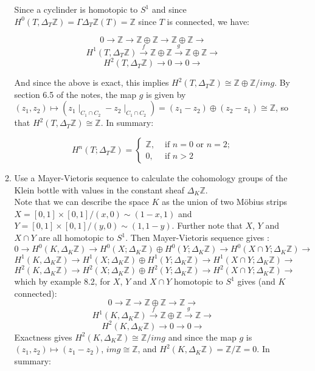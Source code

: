 \documentclass{article}
\newcommand{\zed}{\mathbb Z}
\begin{document}
\begin{enumerate}
\begin{enumerate}
Since a cyclinder is homotopic to $S^1$ and since $ H^0(T, \Delta_T\mathbb{Z}) = \Gamma \Delta_T\mathbb{Z} (T) = \mathbb{Z}$ since $T$ is connected, we have:

\[0 \rightarrow \mathbb{Z} \rightarrow \mathbb{Z} \oplus \mathbb{Z} \xrightarrow{}  \mathbb{Z} \oplus \mathbb{Z} \rightarrow\]
\[ H^1(T, \Delta_T\mathbb{Z}) \xrightarrow{f} \mathbb{Z} \oplus \mathbb{Z} \xrightarrow{g} \mathbb{Z} \oplus \mathbb{Z} \rightarrow\]
\[ H^2(T, \Delta_T\mathbb{Z}) \rightarrow 0 \rightarrow 0 \rightarrow\]
 
 And since the above is exact, this implies $H^2(T, \Delta_T\mathbb{Z})  \cong \mathbb{Z} \oplus \mathbb{Z} / im g$. By section 6.5 of the notes, the map $g$ is given by $(z_1,z_2) \mapsto (z_1\mid_{C_1 \cap C_2} - z_2\mid_{C_1 \cap C_2} ) = (z_1 - z_2) \oplus (z_2 - z_1) \cong \mathbb{Z} $, so that $H^2(T, \Delta_T\mathbb{Z}) \cong \mathbb{Z}$. In summary:
 
 \[H^n(T; \Delta_T\mathbb{Z}) = \begin{cases} 
 \mathbb{Z}, & \text{ if } n=0 \text{ or } n=2; \\
0, & \text{ if } n >2 
 \end{cases}
\]
\item Use a Mayer-Vietoris sequence to calculate the cohomology groups of the Klein bottle with values in the constant sheaf $\Delta_K\zed$. \\

Note that we can describe the space $K$ as the union of two M\"obius strips $X = [0,1]\times[0,1]/(x, 0) \sim (1 - x, 1)$ and $Y =  [0,1]\times[0,1]/(y, 0) \sim (1, 1-y)$. Further note that $X$, $Y$ and $X \cap Y$ are all homotopic to $S^1$. Then Mayer-Vietoris sequence gives :
\[0 \rightarrow H^0(K, \Delta_K\mathbb{Z}) \rightarrow H^0(X;\Delta_K\mathbb{Z}) \oplus H^0(Y;\Delta_K\mathbb{Z}) \rightarrow H^0(X \cap Y; \Delta_K\mathbb{Z}) \rightarrow\]
 \[H^1(K, \Delta_K\mathbb{Z}) \rightarrow H^1(X;\Delta_K\mathbb{Z}) \oplus H^1(Y;\Delta_K\mathbb{Z}) \rightarrow H^1(X \cap Y; \Delta_K\mathbb{Z}) \rightarrow  \]
\[H^2(K, \Delta_K\mathbb{Z}) \rightarrow H^2(X;\Delta_K\mathbb{Z}) \oplus H^2(Y;\Delta_K\mathbb{Z}) \rightarrow H^2(X \cap Y; \Delta_K\mathbb{Z}) \rightarrow  \]
which by example 8.2, for $X$, $Y$ and $X \cap Y$ homotopic to $S^1$ gives (and $K$ connected):
\[0 \rightarrow \mathbb{Z} \rightarrow \mathbb{Z} \oplus \mathbb{Z} \rightarrow \mathbb{Z} \rightarrow\]
\[H^1(K, \Delta_K\mathbb{Z}) \xrightarrow{f} \mathbb{Z} \oplus \mathbb{Z} \xrightarrow{g} \mathbb{Z} \rightarrow \]
\[H^2(K, \Delta_K\mathbb{Z}) \rightarrow 0 \rightarrow 0 \rightarrow  \]
Exactness gives $H^2(K, \Delta_K\mathbb{Z}) \cong \mathbb{Z}/im g$ and since the map $g$ is $(z_1, z_2) \mapsto (z_1 - z_2)$, $im g \cong \mathbb{Z}$, and $H^2(K, \Delta_K\mathbb{Z}) = \mathbb{Z} / \mathbb{Z} = 0$. In summary:


\end{enumerate}
\end{enumerate}
\end{document}
